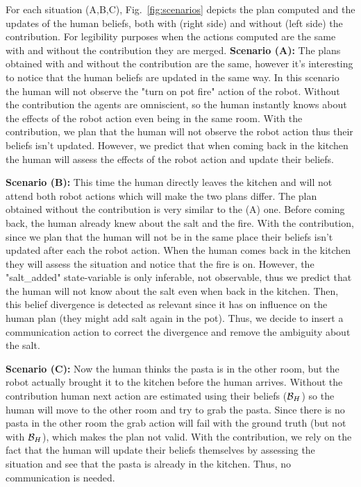 \documentclass[letterpaper]{article} %
\begin{document}
For each situation (A,B,C), Fig.~\ref{fig:scenarios} depicts the plan computed and the updates of the human beliefs, both with (right side) and without (left side) the contribution. For legibility purposes when the actions computed are the same with and without the contribution they are merged.
\textbf{Scenario (A):} The plans obtained with and without the contribution are the same, however it's interesting to notice that the human beliefs are updated in the same way. In this scenario the human will not observe the "turn on pot fire" action of the robot. Without the contribution the agents are omniscient, so the human instantly knows about the effects of the robot action even being in the same room. With the contribution, we plan that the human will not observe the robot action thus their beliefs isn't updated. However, we predict that when coming back in the kitchen the human will assess the effects of the robot action and update their beliefs.

\textbf{Scenario (B):} This time the human directly leaves the kitchen and will not attend both robot actions which will make the two plans differ. The plan obtained without the contribution is very similar to the (A) one. Before coming back, the human already knew about the salt and the fire. With the contribution, since we plan that the human will not be in the same place their beliefs isn't updated after each the robot action. When the human comes back in the kitchen they will assess the situation and notice that the fire is on. However, the "salt\_added" state-variable is only inferable, not observable, thus we predict that the human will not know about the salt even when back in the kitchen. Then, this belief divergence is detected as relevant since it has on influence on the human plan (they might add salt again in the pot). Thus, we decide to insert a communication action to correct the divergence and remove the ambiguity about the salt.

\textbf{Scenario (C):} Now the human thinks the pasta is in the other room, but the robot actually brought it to the kitchen before the human arrives. Without the contribution human next action are estimated using their beliefs ($\mathcal{B}_H$) so the human will move to the other room and try to grab the pasta. Since there is no pasta in the other room the grab action will fail with the ground truth (but not with $\mathcal{B}_H$), which makes the plan not valid. With the contribution, we rely on the fact that the human will update their beliefs themselves by assessing the situation and see that the pasta is already in the kitchen. Thus, no communication is needed.
\end{document}

